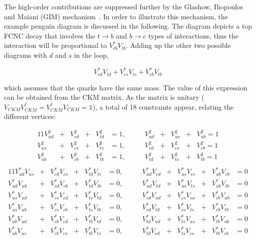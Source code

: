 The high-order contributions are suppressed further by the Glashow, Iliopoulos and Maiani (GIM) mechanism~\cite{PhysRevD.2.1285}. In order to illustrate this mechanism, the example penguin diagram is discussed in the following. The diagram depicts a top FCNC decay that involves the $t\to b$ and $b\to c$ types of interactions, thus the interaction will be proportional to $V_{cb}^*V_{tb}$. Adding up the other two possible diagrams with $d$ and $s$ in the loop, 

\begin{equation}
    V_{cd}^*V_{td}+V_{cs}^*V_{ts}+V_{cb}^*V_{tb}
\end{equation}

which assumes that the quarks have the same mass. The value of this expression can be obtained from the CKM matrix. As the matrix is unitary ($V_{CKM}V_{CKM}^\dagger=V_{CKM}^\dagger V_{CKM}=\mathds{1}$), a total of 18 constraints appear, relating the different vertices: 

\begin{alignat*}{11}
    V_{ud}^2&+&V_{cd}^2&+&V_{td}^2&=1,   &\qquad V_{ud}^2&+&V_{us}^2&+&V_{ub}^2=1  \\
    V_{us}^2&+&V_{cs}^2&+&V_{ts}^2&=1,   &\qquad V_{cd}^2&+&V_{cs}^2&+&V_{cb}^2=1 \\
    V_{ub}^2&+&V_{cb}^2&+&V_{tb}^2&=1,   &\qquad V_{td}^2&+&V_{ts}^2&+&V_{tb}^2=1 \\
\end{alignat*}
\vspace{-1em}
\begin{alignat}{11}
    V_{ud}^*V_{us}&+&V_{cd}^*V_{cs}&+&V_{td}^*V_{ts}&=0,   &\qquad V_{ud}^*V_{cd}&+&V_{us}^*V_{cs}&+&V_{ub}^*V_{cb}&=0 \nonumber \\
    V_{ud}^*V_{ub}&+&V_{cd}^*V_{cb}&+&V_{td}^*V_{tb}&=0,   &\qquad V_{ud}^*V_{td}&+&V_{us}^*V_{ts}&+&V_{ub}^*V_{tb}&=0 \\ 
    V_{us}^*V_{ud}&+&V_{cs}^*V_{cd}&+&V_{ts}^*V_{td}&=0,   &\qquad V_{cd}^*V_{ud}&+&V_{cs}^*V_{us}&+&V_{cb}^*V_{ub}&=0 \nonumber\\
    V_{us}^*V_{ub}&+&V_{cs}^*V_{cb}&+&V_{ts}^*V_{tb}&=0,   &\qquad V_{cd}^*V_{td}&+&V_{cs}^*V_{ts}&+&V_{cb}^*V_{tb}&=0 \nonumber\\
    V_{ub}^*V_{ud}&+&V_{cb}^*V_{cd}&+&V_{tb}^*V_{td}&=0,   &\qquad V_{td}^*V_{ud}&+&V_{ts}^*V_{us}&+&V_{tb}^*V_{ub}&=0 \nonumber\\
    V_{ub}^*V_{us}&+&V_{cb}^*V_{cs}&+&V_{tb}^*V_{ts}&=0,   &\qquad V_{td}^*V_{cd}&+&V_{ts}^*V_{cs}&+&V_{tb}^*V_{cb}&=0 \nonumber
\end{alignat}

